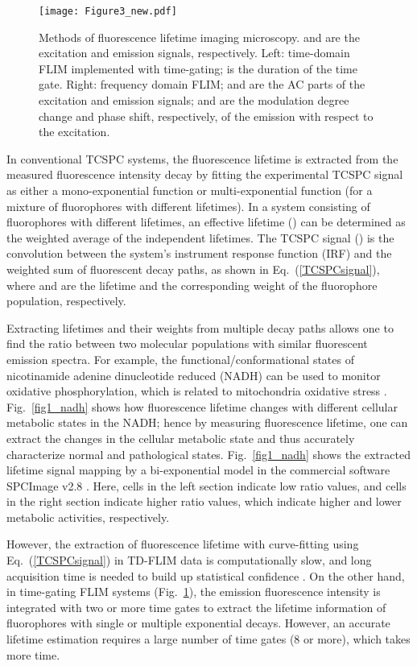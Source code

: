 \documentclass[12pt]{iopart}
\begin{document}
\begin{figure}[!t]
\centering
\texttt{[image: Figure3\_new.pdf]}
\caption{Methods of fluorescence lifetime imaging microscopy.  and  are the excitation and emission signals, respectively. Left: time-domain FLIM implemented with time-gating;  is the duration of the time gate. Right: frequency domain FLIM;  and  are the AC parts of the excitation and emission signals;  and  are the modulation degree change and phase shift, respectively, of the emission with respect to the excitation.} \label{td_fd_illu}
\end{figure}

In conventional TCSPC systems, the fluorescence lifetime is extracted from the measured fluorescence intensity decay by fitting the experimental TCSPC signal as either a mono-exponential function or multi-exponential function (for a mixture of fluorophores with different lifetimes). In a system consisting of fluorophores with different lifetimes, an effective lifetime () can be determined as the weighted average of the independent lifetimes. The TCSPC signal () is the convolution between the system's instrument response function (IRF) and the weighted sum of fluorescent decay paths, as shown in Eq.~(\ref{TCSPCsignal}), where  and  are the lifetime and the corresponding weight of the  fluorophore population, respectively. 



Extracting lifetimes and their weights from multiple decay paths allows one to find the ratio between two molecular populations with similar fluorescent emission spectra. For example, the functional/conformational states of nicotinamide adenine dinucleotide reduced (NADH) can be used to monitor oxidative phosphorylation, which is related to mitochondria oxidative stress \cite{nadh}. Fig.~\ref{fig1_nadh} shows how fluorescence lifetime changes with different cellular metabolic states in the NADH; hence by measuring fluorescence lifetime, one can extract the changes in the cellular metabolic state and thus accurately characterize normal and pathological states. Fig.~\ref{fig1_nadh} shows the extracted lifetime signal mapping by a bi-exponential model in the commercial software SPCImage v2.8 \cite{spcimage}. Here, cells in the left section indicate low  ratio values, and cells in the right section indicate higher  ratio values, which indicate higher and lower metabolic activities, respectively.    

However, the extraction of fluorescence lifetime with curve-fitting using Eq.~(\ref{TCSPCsignal}) in TD-FLIM data is computationally slow, and long acquisition time is needed to build up statistical confidence \cite{error_prop}. On the other hand, in time-gating FLIM systems (Fig.~\ref{td_fd_illu}), the emission fluorescence intensity is integrated with two or more time gates to extract the lifetime information of fluorophores with single or multiple exponential decays. However, an accurate lifetime estimation requires a large number of time gates (8 or more), which takes more time.
\end{document}
